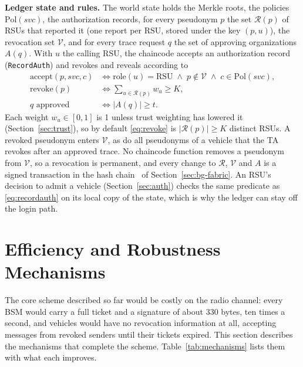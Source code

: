\textbf{Ledger state and rules.} The world state holds the Merkle roots, the policies
$\mathrm{Pol}(\mathit{svc})$, the authorization records, for every pseudonym $p$ the set
$\mathcal{R}(p)$ of RSUs that reported it (one report per RSU, stored under the key $(p, u)$), the
revocation set $\mathcal{V}$, and for every trace request $q$ the set of approving organizations
$A(q)$. With $u$ the calling RSU, the chaincode accepts an authorization record
(\texttt{RecordAuth}) and revokes and reveals according to
\begin{align}
  \mathrm{accept}(p, \mathit{svc}, c)
    &\iff \mathrm{role}(u) = \mathrm{RSU} \;\wedge\; p \notin \mathcal{V}
       \;\wedge\; c \in \mathrm{Pol}(\mathit{svc}), \label{eq:recordauth}\\
  \mathrm{revoke}(p) &\iff \textstyle\sum_{u \in \mathcal{R}(p)} w_u \ge K, \label{eq:revoke}\\
  q \text{ approved} &\iff |A(q)| \ge t. \label{eq:trace}
\end{align}
Each weight $w_u \in [0, 1]$ is 1 unless trust weighting has lowered it (Section~\ref{sec:trust}), so
by default \eqref{eq:revoke} is $|\mathcal{R}(p)| \ge K$ distinct RSUs. A revoked pseudonym enters
$\mathcal{V}$, as do all pseudonyms of a vehicle that the TA revokes after an approved trace. No chaincode function removes
a pseudonym from $\mathcal{V}$, so a revocation is permanent, and every change to $\mathcal{R}$,
$\mathcal{V}$ and $A$ is a signed transaction in the hash chain~\cite{lamport1981password} of Section~\ref{sec:bg-fabric}. An
RSU's decision to admit a vehicle (Section~\ref{sec:auth}) checks the same predicate as
\eqref{eq:recordauth} on its local copy of the state, which is why the ledger can stay off the login
path.

\section{Efficiency and Robustness Mechanisms}\label{sec:mechanisms}

The core scheme described so far would be costly on the radio channel: every BSM would
carry a full ticket and a signature of about 330 bytes, ten times a second, and vehicles would have
no revocation information at all, accepting messages from revoked senders until their tickets
expired. This section describes the mechanisms that complete the scheme. Table~\ref{tab:mechanisms}
lists them with what each improves.

